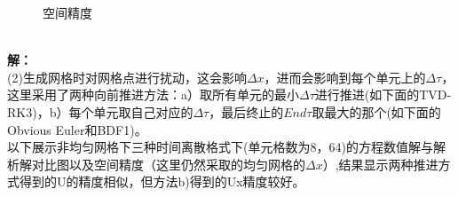 \documentclass[a4paper,11pt,UTF8]{article}%
\theoremstyle{plain}
\begin{document}
\begin{figure}[!h]
	\centering
	\hfill
	\caption{空间精度}
\end{figure}\leavevmode\\
\clearpage
\textbf{解：}\\
\indent(2)生成网格时对网格点进行扰动，这会影响$\Delta x$，进而会影响到每个单元上的$\Delta \tau$，这里采用了两种向前推进方法：a）取所有单元的最小$\Delta \tau$进行推进(如下面的TVD-RK3)，b）每个单元取自己对应的$\Delta \tau$，最后终止的$End \tau$取最大的那个(如下面的Obvious Euler和BDF1)。\\
\indent 以下展示非均匀网格下三种时间离散格式下(单元格数为8，64)的方程数值解与解析解对比图以及空间精度（这里仍然采取的均匀网格的$\Delta x$）,结果显示两种推进方式得到的U的精度相似，但方法b)得到的Ux精度较好。\\
\end{document}
